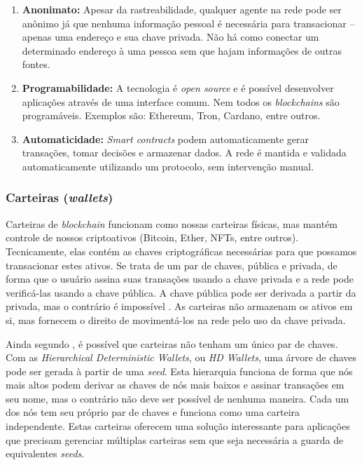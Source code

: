 {\begin{enumerate}
    \item \textbf{Anonimato:} Apesar da rastreabilidade, qualquer agente na rede pode ser anônimo já que nenhuma informação pessoal é necessária para transacionar -- apenas uma endereço e sua chave privada. Não há como conectar um determinado endereço à uma pessoa sem que hajam informações de outras fontes.
    \item \textbf{Programabilidade:} A tecnologia é \textit{open source} e é possível desenvolver aplicações através de uma interface comum. Nem todos os \textit{blockchains} são programáveis. Exemplos são: Ethereum, Tron, Cardano, entre outros.
    \item \textbf{Automaticidade:} \textit{Smart contracts} podem automaticamente gerar transações, tomar decisões e armazenar dados. A rede é mantida e validada automaticamente utilizando um protocolo, sem intervenção manual.
\end{enumerate}

\subsubsection{\esp Carteiras (\textit{wallets})} \label{wallets}
Carteiras de \textit{blockchain} funcionam como nossas carteiras físicas, mas mantém controle de nossos criptoativos (Bitcoin, Ether, NFTs, entre outros). Tecnicamente, elas contém as chaves criptográficas necessárias para que possamos transacionar estes ativos. Se trata de um par de chaves, pública e privada, de forma que o usuário assina suas transações usando a chave privada e a rede pode verificá-las usando a chave pública. A chave pública pode ser derivada a partir da privada, mas o contrário é impossível \cite{di2020arcula}. As carteiras não armazenam os ativos em si, mas fornecem o direito de movimentá-los na rede pelo uso da chave privada.

Ainda segundo , é possível que carteiras não tenham um único par de chaves. Com as \textit{Hierarchical Deterministic Wallets}, ou \textit{HD Wallets}, uma árvore de chaves pode ser gerada à partir de uma \textit{seed}. Esta hierarquia funciona de forma que nós mais altos podem derivar as chaves de nós mais baixos e assinar transações em seu nome, mas o contrário não deve ser possível de nenhuma maneira. Cada um dos nós tem seu próprio par de chaves e funciona como uma carteira independente. Estas carteiras oferecem uma solução interessante para aplicações que precisam gerenciar múltiplas carteiras sem que seja necessária a guarda de equivalentes \textit{seeds}.

}
